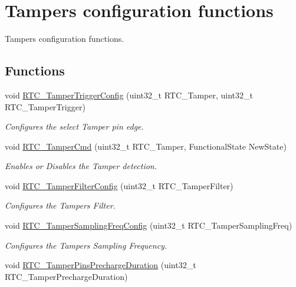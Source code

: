 \hypertarget{group___r_t_c___group9}{\section{Tampers configuration functions}
\label{group___r_t_c___group9}
}


Tampers configuration functions.  


\subsection*{Functions}
\begin{DoxyCompactItemize}
\item 
void \hyperlink{group___r_t_c___group9_gad547d636cfc4fd8d4d673325571e0ffb}{R\-T\-C\-\_\-\-Tamper\-Trigger\-Config} (uint32\-\_\-t R\-T\-C\-\_\-\-Tamper, uint32\-\_\-t R\-T\-C\-\_\-\-Tamper\-Trigger)
\begin{DoxyCompactList}\small\item\em Configures the select Tamper pin edge. \end{DoxyCompactList}\item 
void \hyperlink{group___r_t_c___group9_gaf85cc696d624da0de9fbe99779402833}{R\-T\-C\-\_\-\-Tamper\-Cmd} (uint32\-\_\-t R\-T\-C\-\_\-\-Tamper, Functional\-State New\-State)
\begin{DoxyCompactList}\small\item\em Enables or Disables the Tamper detection. \end{DoxyCompactList}\item 
void \hyperlink{group___r_t_c___group9_ga1e87b9ae757ad12d7585e4fbcbf2c4b8}{R\-T\-C\-\_\-\-Tamper\-Filter\-Config} (uint32\-\_\-t R\-T\-C\-\_\-\-Tamper\-Filter)
\begin{DoxyCompactList}\small\item\em Configures the Tampers Filter. \end{DoxyCompactList}\item 
void \hyperlink{group___r_t_c___group9_gadc7f33a31df80b5deac313fc8af8d7f7}{R\-T\-C\-\_\-\-Tamper\-Sampling\-Freq\-Config} (uint32\-\_\-t R\-T\-C\-\_\-\-Tamper\-Sampling\-Freq)
\begin{DoxyCompactList}\small\item\em Configures the Tampers Sampling Frequency. \end{DoxyCompactList}\item 
void \hyperlink{group___r_t_c___group9_gafc176a013076a651862dc6a957286025}{R\-T\-C\-\_\-\-Tamper\-Pins\-Precharge\-Duration} (uint32\-\_\-t R\-T\-C\-\_\-\-Tamper\-Precharge\-Duration)

\end{DoxyCompactItemize}
